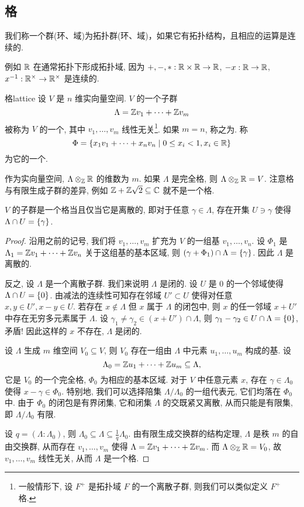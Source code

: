 \subsection{格}
我们称一个群(环、域)为拓扑群(环、域)，如果它有拓扑结构，且相应的运算是连续的.
\begin{example}
例如 ${\mathbb{R}}$ 在通常拓扑下形成拓扑域, 因为 $+,-,*:{\mathbb{R}}\times{\mathbb{R}}\to {\mathbb{R}}$, $-x:{\mathbb{R}}\to {\mathbb{R}}$, $x^{-1}:{\mathbb{R}}^\times\to {\mathbb{R}}^\times$ 是连续的.
\end{example}

\begin{definition}{格}{lattice}
设 $V$ 是 $n$ 维实向量空间. $V$ 的一个子群
	\[\Lambda={\mathbb{Z}} v_1+\dots+{\mathbb{Z}} v_m\]
被称为 $V$ 的一个, 其中 $v_1,\dots,v_m$ 线性无关\footnote{一般情形下, 设 $F^+$ 是拓扑域 $F$ 的一个离散子群, 则我们可以类似定义 $F^+$ 格.}. 如果 $m=n$, 称之为. 称
	\[\Phi=\left\{x_1 v_1+\dots+x_n v_n\mid 0\le x_i<1,x_i\in{\mathbb{R}}\right\}\]
为它的一个.
\end{definition}

作为实向量空间, $\Lambda\otimes_{\mathbb{Z}}{\mathbb{R}}$ 的维数为 $m$. 如果 $\Lambda$ 是完全格, 则 $\Lambda\otimes_{\mathbb{Z}}{\mathbb{R}}=V$. 注意格与有限生成子群的差异, 例如 ${\mathbb{Z}}+{\mathbb{Z}}\sqrt{2}\subseteq {\mathbb{C}}$ 就不是一个格.

\begin{proposition}{}{}
$V$ 的子群是一个格当且仅当它是离散的, 即对于任意 $\gamma\in \Lambda$, 存在开集 $U\ni \gamma$ 使得 $\Lambda\cap U=\left\{\gamma\right\}$.
\end{proposition}
\begin{proof}
沿用之前的记号, 我们将 $v_1,\dots,v_m$ 扩充为 $V$ 的一组基 $v_1,\dots,v_n$. 设 $\Phi_1$ 是 $\Lambda_1={\mathbb{Z}} v_1+\cdots+{\mathbb{Z}} v_n$ 关于这组基的基本区域, 则 $(\gamma+\Phi_1)\cap \Lambda=\left\{\gamma\right\}$. 因此 $\Lambda$ 是离散的.

反之, 设 $\Lambda$ 是一个离散子群. 我们来说明 $\Lambda$ 是闭的. 设 $U$ 是 $0$ 的一个邻域使得 $\Lambda\cap U=\left\{0\right\}$. 由减法的连续性可知存在邻域 $U'\subset U$ 使得对任意 $x,y\in U', x-y\in U$. 若存在 $x\notin \Lambda$ 但 $x$ 属于 $\Lambda$ 的闭包中, 则 $x$ 的任一邻域 $x+U'$ 中存在无穷多元素属于 $\Lambda$. 设 $\gamma_1\neq\gamma_2\in (x+U')\cap\Lambda$, 则 $\gamma_1-\gamma_2\in U\cap\Lambda=\left\{0\right\}$, 矛盾! 因此这样的 $x$ 不存在, $\Lambda$ 是闭的.

设 $\Lambda$ 生成 $m$ 维空间 $V_0\subseteq V$, 则 $V_0$ 存在一组由 $\Lambda$ 中元素 $u_1,\dots,u_m$ 构成的基. 设
	\[\Lambda_0={\mathbb{Z}} u_1+\cdots+{\mathbb{Z}} u_m\subseteq \Lambda,\]
它是 $V_0$ 的一个完全格, $\Phi_0$ 为相应的基本区域. 对于 $V$ 中任意元素 $x$, 存在 $\gamma\in\Lambda_0$ 使得 $x-\gamma\in\Phi_0$. 特别地, 我们可以选择陪集 $\Lambda/\Lambda_0$ 的一组代表元, 它们均落在 $\Phi_0$ 中. 由于 $\Phi_0$ 的闭包是有界闭集, 它和闭集 $\Lambda$ 的交既紧又离散, 从而只能是有限集, 即 $\Lambda/\Lambda_0$ 有限. 

设 $q=(\Lambda:\Lambda_0)$, 则 $\Lambda_0\subseteq \Lambda\subseteq \frac{1}{q}\Lambda_0$. 由有限生成交换群的结构定理, $\Lambda$ 是秩 $m$ 的自由交换群, 从而存在 $v_1,\dots,v_m$ 使得 $\Lambda={\mathbb{Z}} v_1+\cdots+{\mathbb{Z}} v_m$. 而 $\Lambda\otimes_{\mathbb{Z}}{\mathbb{R}}=V_0$, 故 $v_1,\dots,v_m$ 线性无关, 从而 $\Lambda$ 是一个格.
\end{proof}

